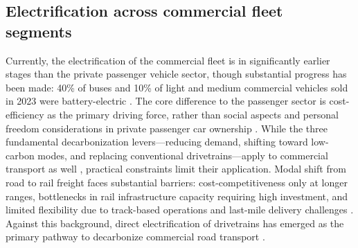         \subsection{Electrification across commercial fleet segments}
        Currently, the electrification of the commercial fleet is in significantly earlier stages than the private passenger vehicle sector, though substantial progress has been made: 40\% of buses and 10\% of light and medium commercial vehicles sold in 2023 were battery-electric \cite{ICCT2025EuropeanVehicle}. The core difference to the passenger sector is cost-efficiency as the primary driving force, rather than social aspects and personal freedom considerations in private passenger car ownership \cite{ANDERHOFSTADT201987}. While the three fundamental decarbonization levers—reducing demand, shifting toward low-carbon modes, and replacing conventional drivetrains—apply to commercial transport as well \cite{bmik2021mobility}, practical constraints limit their application. Modal shift from road to rail freight faces substantial barriers: cost-competitiveness only at longer ranges, bottlenecks in rail infrastructure capacity requiring high investment, and limited flexibility due to track-based operations and last-mile delivery challenges \citep{Karam2023, Islam2016}. Against this background, direct electrification of drivetrains has emerged as the primary pathway to decarbonize commercial road transport \citep{Auer2020, Plötz2022}.

